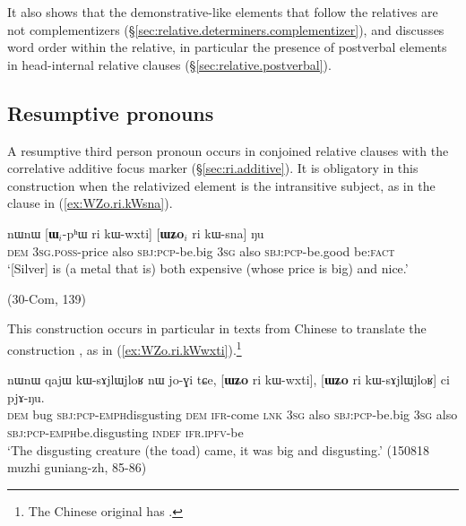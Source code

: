 It also shows that the demonstrative-like elements  that follow the relatives 
are not complementizers (§\ref{sec:relative.determiners.complementizer}), and discusses word order within the relative, in particular the presence of postverbal elements in head-internal relative clauses (§\ref{sec:relative.postverbal}).

\subsection{Resumptive pronouns} \label{sec:resumptive}
A resumptive third person pronoun  occurs in conjoined relative clauses with the correlative additive focus marker  (§\ref{sec:ri.additive}). It is obligatory in this construction when the relativized element is the intransitive subject, as in the clause  in (\ref{ex:WZo.ri.kWsna}).

\begin{exe}
\ex \label{ex:WZo.ri.kWsna}
\gll nɯnɯ [\textbf{ɯ}$_i$-pʰɯ ri kɯ-wxti] [\textbf{ɯʑo}$_i$ ri kɯ-sna] ŋu \\
\textsc{dem} \textsc{3sg}.\textsc{poss}-price also \textsc{sbj}:\textsc{pcp}-be.big \textsc{3sg} also \textsc{sbj}:\textsc{pcp}-be.good be:\textsc{fact} \\
\glt `[Silver] is (a metal that is) both expensive (whose price is big) and nice.'

 (30-Com, 139)
\end{exe}

This construction occurs in particular in texts from Chinese to translate the construction , as in (\ref{ex:WZo.ri.kWwxti}).\footnote{The Chinese original has .}

\begin{exe}
\ex \label{ex:WZo.ri.kWwxti}
\gll nɯnɯ qajɯ kɯ-sɤjlɯ\redp{}jloʁ nɯ jo-ɣi tɕe,  [\textbf{ɯʑo} ri kɯ-wxti], [\textbf{ɯʑo} ri kɯ-sɤjlɯ\redp{}jloʁ] ci pjɤ-ŋu. \\
\textsc{dem} bug \textsc{sbj}:\textsc{pcp}-\textsc{emph}\redp{}disgusting \textsc{dem} \textsc{ifr}-come \textsc{lnk} 
\textsc{3sg} also \textsc{sbj}:\textsc{pcp}-be.big \textsc{3sg} also \textsc{sbj}:\textsc{pcp}-\textsc{emph}\redp{}be.disgusting \textsc{indef} \textsc{ifr}.\textsc{ipfv}-be \\
\glt `The disgusting creature (the toad) came, it was big and disgusting.' (150818 muzhi guniang-zh, 85-86)
\end{exe}
 
